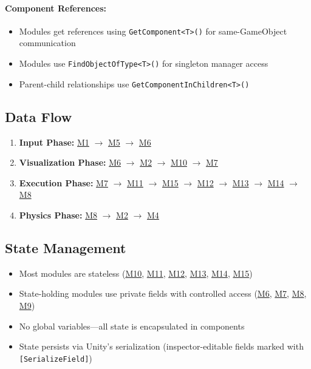 \documentclass[12pt, titlepage]{article}
\begin{document}
\paragraph{Component References:}
\begin{itemize}
\item Modules get references using \texttt{GetComponent<T>()} for same-GameObject communication
\item Modules use \texttt{FindObjectOfType<T>()} for singleton manager access
\item Parent-child relationships use \texttt{GetComponentInChildren<T>()}
\end{itemize}

\subsection{Data Flow}

\begin{enumerate}
\item \textbf{Input Phase:} \hyperref[M1]{M1} $\rightarrow$ \hyperref[M5]{M5} $\rightarrow$ \hyperref[M6]{M6}
\item \textbf{Visualization Phase:} \hyperref[M6]{M6} $\rightarrow$ \hyperref[M2]{M2} $\rightarrow$ \hyperref[M10]{M10} $\rightarrow$ \hyperref[M7]{M7}
\item \textbf{Execution Phase:} \hyperref[M7]{M7} $\rightarrow$ \hyperref[M11]{M11} $\rightarrow$ \hyperref[M15]{M15} $\rightarrow$ \hyperref[M12]{M12} $\rightarrow$ \hyperref[M13]{M13} $\rightarrow$ \hyperref[M14]{M14} $\rightarrow$ \hyperref[M8]{M8}
\item \textbf{Physics Phase:} \hyperref[M8]{M8} $\rightarrow$ \hyperref[M2]{M2} $\rightarrow$ \hyperref[M4]{M4}
\end{enumerate}

\subsection{State Management}

\begin{itemize}
\item Most modules are stateless (\hyperref[M10]{M10}, \hyperref[M11]{M11}, \hyperref[M12]{M12}, \hyperref[M13]{M13}, \hyperref[M14]{M14}, \hyperref[M15]{M15})
\item State-holding modules use private fields with controlled access (\hyperref[M6]{M6}, \hyperref[M7]{M7}, \hyperref[M8]{M8}, \hyperref[M9]{M9})
\item No global variables---all state is encapsulated in components
\item State persists via Unity's serialization (inspector-editable fields marked with \texttt{[SerializeField]})
\end{itemize}
\end{document}
